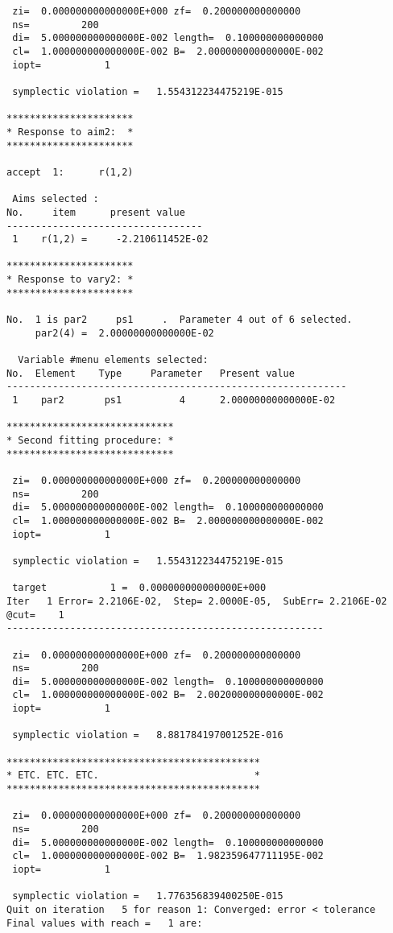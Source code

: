 \begin{footnotesize}
\begin{verbatim}
 zi=  0.000000000000000E+000 zf=  0.200000000000000
 ns=         200
 di=  5.000000000000000E-002 length=  0.100000000000000
 cl=  1.000000000000000E-002 B=  2.000000000000000E-002
 iopt=           1

 symplectic violation =   1.554312234475219E-015

**********************
* Response to aim2:  *
**********************

accept  1:      r(1,2)

 Aims selected :
No.     item      present value
----------------------------------
 1    r(1,2) =     -2.210611452E-02

**********************
* Response to vary2: *
**********************

No.  1 is par2     ps1     .  Parameter 4 out of 6 selected.
     par2(4) =  2.00000000000000E-02

  Variable #menu elements selected:
No.  Element    Type     Parameter   Present value
-----------------------------------------------------------
 1    par2       ps1          4      2.00000000000000E-02

*****************************
* Second fitting procedure: *
*****************************

 zi=  0.000000000000000E+000 zf=  0.200000000000000
 ns=         200
 di=  5.000000000000000E-002 length=  0.100000000000000
 cl=  1.000000000000000E-002 B=  2.000000000000000E-002
 iopt=           1

 symplectic violation =   1.554312234475219E-015

 target           1 =  0.000000000000000E+000
Iter   1 Error= 2.2106E-02,  Step= 2.0000E-05,  SubErr= 2.2106E-02 @cut=    1
-------------------------------------------------------

 zi=  0.000000000000000E+000 zf=  0.200000000000000
 ns=         200
 di=  5.000000000000000E-002 length=  0.100000000000000
 cl=  1.000000000000000E-002 B=  2.002000000000000E-002
 iopt=           1

 symplectic violation =   8.881784197001252E-016

********************************************
* ETC. ETC. ETC.                           *
********************************************

 zi=  0.000000000000000E+000 zf=  0.200000000000000
 ns=         200
 di=  5.000000000000000E-002 length=  0.100000000000000
 cl=  1.000000000000000E-002 B=  1.982359647711195E-002
 iopt=           1

 symplectic violation =   1.776356839400250E-015
Quit on iteration   5 for reason 1: Converged: error < tolerance
Final values with reach =   1 are:


\end{verbatim}
\end{footnotesize}
